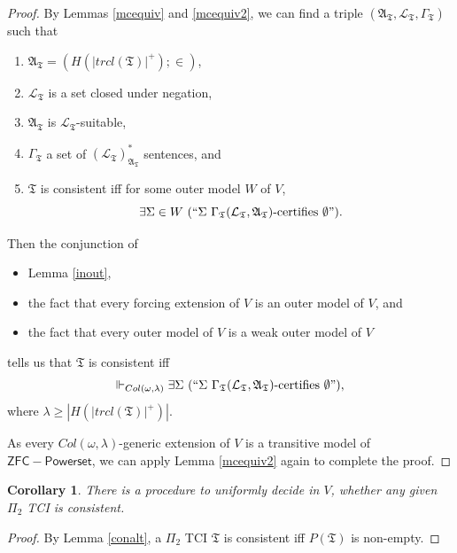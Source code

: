 \documentclass[12pt, twoside]{memoir}
\numberwithin{equation}{section}
\newtheorem{cor}[thm]{Corollary}
\theoremstyle{definition}
\theoremstyle{remark}
\theoremstyle{definition}
\theoremstyle{definition}
\theoremstyle{definition}
\theoremstyle{remark}
\begin{document}
\begin{proof}
By Lemmas \ref{mcequiv} and \ref{mcequiv2}, we can find a triple $(\mathfrak{A}_{\mathfrak{T}}, \mathcal{L}_{\mathfrak{T}}, \Gamma_{\mathfrak{T}})$ such that 
\begin{enumerate}[label=(\alph*)]
    \item $\mathfrak{A}_{\mathfrak{T}} = (H(|trcl(\mathfrak{T})|^+); \in)$,
    \item $\mathcal{L}_{\mathfrak{T}}$ is a set closed under negation, 
    \item $\mathfrak{A}_{\mathfrak{T}}$ is $\mathcal{L}_{\mathfrak{T}}$-suitable, 
    \item $\Gamma_{\mathfrak{T}}$ a set of $({\mathcal{L}_{\mathfrak{T}}})^*_{\mathfrak{A}_{\mathfrak{T}}}$ sentences, and
    \item $\mathfrak{T}$ is consistent iff for some outer model $W$ of $V$, $$\exists \Sigma \in W \ (``\Sigma \ \Gamma_{\mathfrak{T}} (\mathcal{L}_{\mathfrak{T}}, \mathfrak{A}_{\mathfrak{T}})\text{-certifies } \emptyset").$$
\end{enumerate}
Then the conjunction of
\begin{itemize}
    \item Lemma \ref{inout},
    \item the fact that every forcing extension of $V$ is an outer model of $V$, and
    \item the fact that every outer model of $V$ is a weak outer model of $V$
\end{itemize}   
tells us that $\mathfrak{T}$ is consistent iff $$\Vdash_{Col(\omega, \lambda)} \exists \Sigma \ (``\Sigma \ \Gamma_{\mathfrak{T}} (\mathcal{L}_{\mathfrak{T}}, \mathfrak{A}_{\mathfrak{T}})\text{-certifies } \emptyset"),$$ where $\lambda \geq |H(|trcl(\mathfrak{T})|^+)|$. 

As every $Col(\omega, \lambda)$-generic extension of $V$ is a transitive model of $\mathsf{ZFC - Powerset}$, we can apply Lemma \ref{mcequiv2} again to complete the proof. 
\end{proof}

\begin{cor}\label{cor527}
There is a procedure to uniformly decide in $V$, whether any given $\Pi_2$ TCI is consistent.
\end{cor}

\begin{proof}
By Lemma \ref{conalt}, a $\Pi_2$ TCI $\mathfrak{T}$ is consistent iff $P(\mathfrak{T})$ is non-empty.
\end{proof} 
\end{document}
